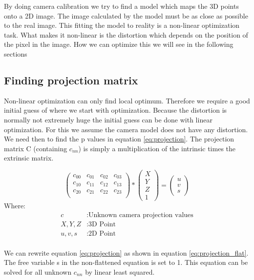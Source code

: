 \documentclass[11pt,a4paper,titlepage,oneside]{report}
\begin{document}
By doing camera calibration we try to find a model which maps the 3D points onto a 2D image. The image calculated by the model must be as close as possible to the real image. This fitting the model to reality is a non-linear optimization task. What makes it non-linear is the distortion which depends on the position of the pixel in the image. How we can optimize this we will see in the following sections

\subsection{Finding projection matrix}
Non-linear optimization can only find local optimum. Therefore we require a good initial guess of where we start with optimization. Because the distortion is normally not extremely huge the initial guess can be done with linear optimization. For this we assume the camera model does not have any distortion. We need then to find the p values in equation \ref{eq:projection}. The projection matrix C (containing $c_{nn}$) is simply a multiplication of the intrinsic times the extrinsic matrix.

\begin{equation}\label{eq:projection}
	\begin{pmatrix}c_{00} & c_{01} & c_{02} & c_{03}\\
		c_{10} & c_{11} & c_{12} & c_{13}\\
		c_{20} & c_{21} & c_{22} & c_{23}\\
	\end{pmatrix}*
	\begin{pmatrix}
		X \\
		Y \\
		Z \\
		1
	\end{pmatrix}=
	\begin{pmatrix}
		u \\
		v \\
		s
  \end{pmatrix}
\end{equation}
Where:
\begin{align*}
  c					&: \text{Unknown camera projection values}\\
	X,Y,Z			&: \text{3D Point}\\
	u,v,s			&: \text{2D Point}\\
\end{align*}

We can rewrite equation \ref{eq:projection} as shown in equation \ref{eq:projection_flat}. The free variable s in the non-flattened equation is set to 1. This equation can be solved for all unknown $c_{nn}$ by linear least squared.
\end{document}
